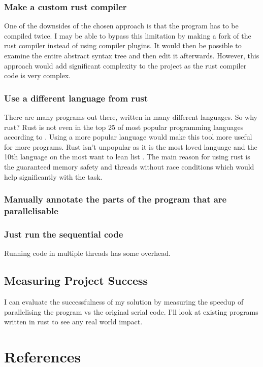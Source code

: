 \documentclass[12pt, a4paper]{article}
\begin{document}
\subsubsection{Make a custom rust compiler}
One of the downsides of the chosen approach is that the program has to be compiled twice. I may be able to bypass this limitation by making a fork of the rust compiler instead of using compiler plugins. It would then be possible to examine the entire abstract syntax tree and then edit it afterwards. However, this approach would add significant complexity to the project as the rust compiler code is very complex.

\subsubsection{Use a different language from rust}
There are many programs out there, written in many different languages. So why rust? Rust is not even in the top 25 of most popular programming languages according to \textcite{stackoverflowsurvey}. Using a more popular language would make this tool more useful for more programs. Rust isn't unpopular as it is the most loved language and the 10th language on the most want to lean list \parencite{stackoverflowsurvey}. The main reason for using rust is the guaranteed memory safety and threads without race conditions which would help significantly with the task.

\subsubsection{Manually annotate the parts of the program that are parallelisable}
\parencite{dagum1998openmp}

\subsubsection{Just run the sequential code}
Running code in multiple threads has some overhead.

\subsection{Measuring Project Success}

I can evaluate the successfulness of my solution by measuring the speedup of parallelising the program vs the original serial code. I'll look at existing programs written in rust to see any real world impact.

\section{References}
\printbibliography[heading=none]
\end{document}
